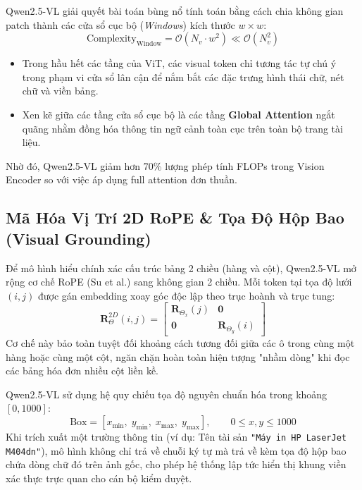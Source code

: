 \documentclass[11pt,a4paper]{article}
\begin{document}
\begin{formulationbox}
Qwen2.5-VL giải quyết bài toán bùng nổ tính toán bằng cách chia không gian patch thành các cửa sổ cục bộ (\textit{Windows}) kích thước $w \times w$:
\begin{equation}
    \text{Complexity}_{\text{Window}} = \mathcal{O}\left( N_v \cdot w^2 \right) \ll \mathcal{O}\left( N_v^2 \right)
\end{equation}
\begin{itemize}[leftmargin=1.5em]
    \item Trong hầu hết các tầng của ViT, các visual token chỉ tương tác tự chú ý trong phạm vi cửa sổ lân cận để nắm bắt các đặc trưng hình thái chữ, nét chữ và viền bảng.
    \item Xen kẽ giữa các tầng cửa sổ cục bộ là các tầng \textbf{Global Attention} ngắt quãng nhằm đồng hóa thông tin ngữ cảnh toàn cục trên toàn bộ trang tài liệu.
\end{itemize}
Nhờ đó, Qwen2.5-VL giảm hơn 70\% lượng phép tính FLOPs trong Vision Encoder so với việc áp dụng full attention đơn thuần.
\end{formulationbox}

\subsection{Mã Hóa Vị Trí 2D RoPE \& Tọa Độ Hộp Bao (Visual Grounding)}

\begin{formulationbox}
Để mô hình hiểu chính xác cấu trúc bảng 2 chiều (hàng và cột), Qwen2.5-VL mở rộng cơ chế RoPE (Su et al.) sang không gian 2 chiều. Mỗi token tại tọa độ lưới $(i, j)$ được gán embedding xoay góc độc lập theo trục hoành và trục tung:
\begin{equation}
    \mathbf{R}_{\Theta}^{2D}(i, j) = \begin{bmatrix} \mathbf{R}_{\Theta_x}(j) & \mathbf{0} \\ \mathbf{0} & \mathbf{R}_{\Theta_y}(i) \end{bmatrix}
\end{equation}
Cơ chế này bảo toàn tuyệt đối khoảng cách tương đối giữa các ô trong cùng một hàng hoặc cùng một cột, ngăn chặn hoàn toàn hiện tượng "nhầm dòng" khi đọc các bảng hóa đơn nhiều cột liền kề.
\end{formulationbox}

\begin{formulationbox}
Qwen2.5-VL sử dụng hệ quy chiếu tọa độ nguyên chuẩn hóa trong khoảng $[0, 1000]$:
\begin{equation}
    \text{Box} = \left[ x_{\min}, \; y_{\min}, \; x_{\max}, \; y_{\max} \right], \qquad 0 \le x, y \le 1000
\end{equation}
Khi trích xuất một trường thông tin (ví dụ: Tên tài sản \texttt{"Máy in HP LaserJet M404dn"}), mô hình không chỉ trả về chuỗi ký tự mà trả về kèm tọa độ hộp bao chứa dòng chữ đó trên ảnh gốc, cho phép hệ thống lập tức hiển thị khung viền xác thực trực quan cho cán bộ kiểm duyệt.
\end{formulationbox}
\end{document}
